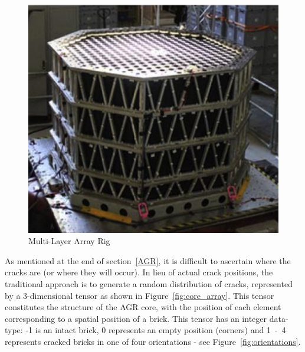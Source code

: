 \begin{figure}[b!]
	\centering
	\includegraphics[scale=0.5]{Figures/MLA_rig}
	\caption{Multi-Layer Array Rig}
	\label{fig:ENG}
\end{figure}

\noindent
As mentioned at the end of section~\ref{AGR}, it is difficult to ascertain where the cracks are (or where they will occur). In lieu of actual crack positions, the traditional approach is to generate a random distribution of cracks, represented by a 3-dimensional tensor as shown in Figure~\ref{fig:core_array}. This tensor constitutes the structure of the AGR core, with the position of each element corresponding to a spatial position of a brick. This tensor has an integer data-type: -1 is an intact brick, 0 represents an empty position (corners) and 1~-~4 represents cracked bricks in one of four orientations - see Figure~\ref{fig:orientations}. \\

